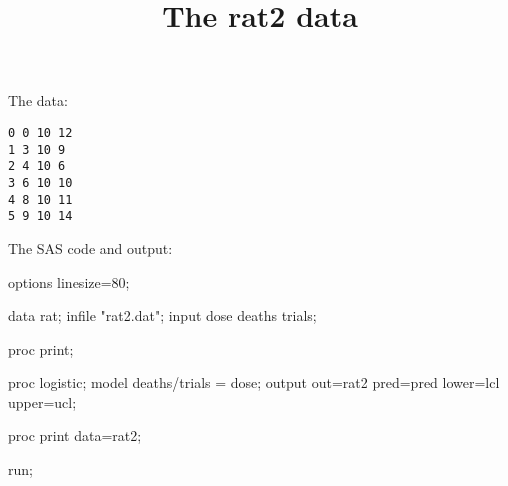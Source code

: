 \documentclass{article}
\title{The rat2 data}
\begin{document}
\maketitle
The data:
\begin{verbatim}
0 0 10 12
1 3 10 9
2 4 10 6
3 6 10 10
4 8 10 11
5 9 10 14
\end{verbatim}
The SAS code and output:
\begin{Winput}
options linesize=80;

data rat;
  infile "rat2.dat";
  input dose deaths trials;

proc print;

proc logistic;
  model deaths/trials = dose;
  output out=rat2 pred=pred lower=lcl upper=ucl;

proc print data=rat2;

run;
\end{Winput}
\end{document}
